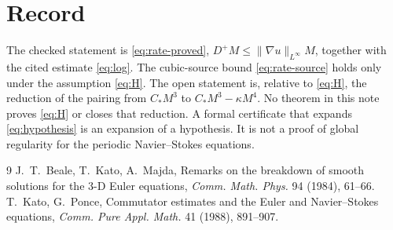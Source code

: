 \documentclass[11pt]{article}
\theoremstyle{definition}
\theoremstyle{remark}
\begin{document}
\section{Record}
The checked statement is \eqref{eq:rate-proved}, $D^+M\le\|\nabla u\|_{L^\infty}M$, together with the cited estimate \eqref{eq:log}. The cubic-source bound \eqref{eq:rate-source} holds only under the assumption \eqref{eq:H}. The open statement is, relative to \eqref{eq:H}, the reduction of the pairing from $C_* M^3$ to $C_* M^3-\kappa M^4$. No theorem in this note proves \eqref{eq:H} or closes that reduction. A formal certificate that expands \eqref{eq:hypothesis} is an expansion of a hypothesis. It is not a proof of global regularity for the periodic Navier--Stokes equations.

\begin{thebibliography}{9}
 J.~T.~Beale, T.~Kato, A.~Majda, Remarks on the breakdown of smooth solutions for the 3-D Euler equations, \emph{Comm. Math. Phys.} 94 (1984), 61--66.
 T.~Kato, G.~Ponce, Commutator estimates and the Euler and Navier--Stokes equations, \emph{Comm. Pure Appl. Math.} 41 (1988), 891--907.
\end{thebibliography}
\end{document}
